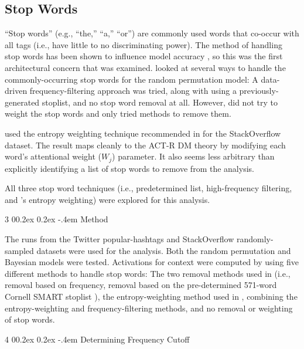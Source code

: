\documentclass[man,donotrepeattitle]{apa6}
\makeatletter
\renewcommand{\subsubsection}{%
  \@startsection
  {subsubsection}%
  {3}%
  {\parindent}%
  {0\baselineskip \@plus 0.2ex \@minus 0.2ex}%
  {-.4em}%
  {\normalfont\normalsize\bfseries\addperi}}
\renewcommand{\paragraph}{%
  \@startsection
  {paragraph}%
  {4}%
  {\parindent}%
  {0\baselineskip \@plus 0.2ex \@minus 0.2ex}%
  {-.4em}%
  {\normalfont\normalsize\bfseries\itshape\addperi}}
\makeatother
\begin{document}
\subsection{Stop Words}

``Stop words'' (e.g., ``the,'' ``a,'' ``or'') are commonly used words that co-occur with all tags (i.e., have little to no discriminating power).
The method of handling stop words has been shown to influence model accuracy \parencite{Sahlgren2008,Stanley2013,Jones2007}, so this was the first architectural concern that was examined.
\textcite{Sahlgren2008} looked at several ways to handle the commonly-occurring stop words for the random permutation model:
A data-driven frequency-filtering approach was tried, along with using a previously-generated stoplist, and no stop word removal at all.
However, \citeauthor{Sahlgren2008} did not try to weight the stop words and only tried methods to remove them.

\textcite{Stanley2013} used the entropy weighting technique recommended in \textcite{Dumais1991} for the StackOverflow dataset.
The result maps cleanly to the ACT-R DM theory by modifying each word's attentional weight ($W_{j}$) parameter.
It also seems less arbitrary than explicitly identifying a list of stop words to remove from the analysis.

All three stop word techniques (i.e., predetermined list, high-frequency filtering, and \textcite{Stanley2013}'s entropy weighting) were explored for this analysis.

\subsubsection{Method}

The runs from the Twitter popular-hashtags and StackOverflow randomly-sampled datasets were used for the analysis.
Both the random permutation and Bayesian models were tested.
Activations for context were computed by using five different methods to handle stop words:
The two removal methods used in \textcite{Sahlgren2008}
(i.e., removal based on frequency, removal based on the pre-determined 571-word Cornell SMART stoplist \parencite{Salton1988}),
the entropy-weighting method used in \textcite{Stanley2013},
combining the entropy-weighting and frequency-filtering methods,
and no removal or weighting of stop words.

\paragraph{Determining Frequency Cutoff}
\end{document}
